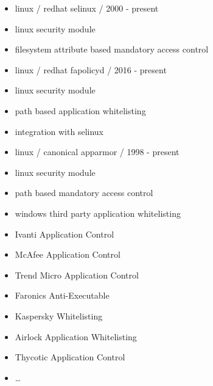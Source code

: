 \documentclass[]{article}
\providecommand{\tightlist}{%
  \setlength{\itemsep}{0pt}\setlength{\parskip}{0pt}}
\begin{document}
\begin{itemize}
\tightlist
\item
  linux / redhat selinux / 2000 - present
\item
  linux security module
\item
  filesystem attribute based mandatory access control
\item
  linux / redhat fapolicyd / 2016 - present
\item
  linux security module
\item
  path based application whitelisting
\item
  integration with selinux
\item
  linux / canonical apparmor / 1998 - present
\item
  linux security module
\item
  path based mandatory access control
\item
  windows third party application whitelisting
\item
  Ivanti Application Control
\item
  McAfee Application Control
\item
  Trend Micro Application Control
\item
  Faronics Anti-Executable
\item
  Kaspersky Whitelisting
\item
  Airlock Application Whitelisting
\item
  Thycotic Application Control
\item
  \ldots{}
\end{itemize}
\end{document}
